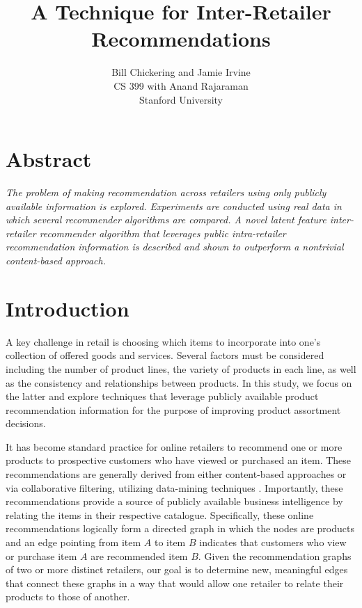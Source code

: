 \documentclass[11pt]{article}
\begin{document}

\title{A Technique for Inter-Retailer Recommendations}
\author{Bill Chickering and Jamie Irvine\\
CS 399 with Anand Rajaraman\\
Stanford University}
\renewcommand{\today}{June 11, 2014}
\maketitle

\section*{Abstract}
\emph{The problem of making recommendation across retailers using only publicly
available information is explored. Experiments are conducted using real data in
which several recommender algorithms are compared. A novel latent feature
inter-retailer recommender algorithm that leverages public intra-retailer
recommendation information is described and shown to outperform a nontrivial
content-based approach.}

\section*{Introduction}
A key challenge in retail is choosing which items to incorporate into one's
collection of offered goods and services.  Several factors must be considered
including the number of product lines, the variety of products in each line, as
well as the consistency and relationships between products. In this study, we
focus on the latter and explore techniques that leverage publicly available
product recommendation information for the purpose of improving product
assortment decisions.

It has become standard practice for online retailers to recommend one or more
products to prospective customers who have viewed or purchased an item. These
recommendations are generally derived from either content-based approaches or
via collaborative filtering, utilizing data-mining techniques \cite{Ricci2011}.
Importantly, these recommendations provide a source of publicly available
business intelligence by relating the items in their respective catalogue.
Specifically, these online recommendations logically form a directed graph in
which the nodes are products and an edge pointing from item $A$ to item $B$
indicates that customers who view or purchase item $A$ are recommended item $B$.
Given the recommendation graphs of two or more distinct retailers, our goal is
to determine new, meaningful edges that connect these graphs in a way that would
allow one retailer to relate their products to those of another.
\end{document}
